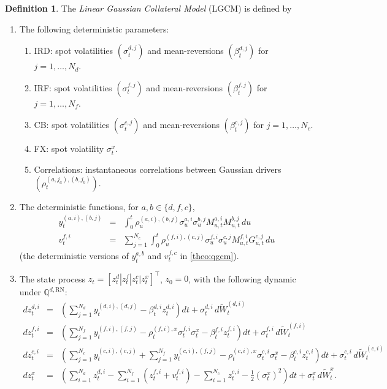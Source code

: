 \documentclass[11pt,english]{amsart}
\newcommand{\RN}{\mathrm{RN}}
\newcommand{\QQ}{\mathbb{Q}}
\theoremstyle{definition}
\newtheorem{defi}{Definition}
\begin{document}
\begin{defi}\label{defi:lgcm}
The \emph{Linear Gaussian Collateral Model} (LGCM) is defined by
\begin{enumerate}
\item The following deterministic parameters:
\begin{enumerate}
\item IRD: spot volatilities $(\sigma^{d,j}_t)$ and mean-reversions $(\beta^{d,j}_t)$ for $j = 1,\ldots, N_d$.
\item IRF: spot volatilities $(\sigma^{f,j}_t)$ and mean-reversions $(\beta^{f,j}_t)$ for $j = 1,\ldots, N_f$.
\item CB: spot volatilities $(\sigma^{c,j}_t)$ and mean-reversions $(\beta^{c,j}_t)$ for $j = 1,\ldots, N_{c}$.
\item FX: spot volatility $\sigma^{x}_t$.
\item Correlations: instantaneous correlations between Gaussian drivers $(\rho^{(a,j_a),(b,j_b)}_t)$.
\end{enumerate}
\item The deterministic functions, for $a,b\in\{d,f,c\}$,
\begin{eqnarray}
  y^{(a,i),(b,j)}_t &=& \int_0^t \rho^{(a,i),(b,j)}_u \sigma^{a,i}_u \sigma^{b,j}_u M^{a,i}_{u,t} M^{b,j}_{u,t}\, du  \\
  v^{f,i}_t &=& \sum_{j=1}^{N_c}\int_0^t \rho^{(f,i),(c,j)}_u \sigma^{f,i}_u \sigma^{c,j}_u M^{f,i}_{u,t} G^{c,j}_{u,t}\, du
\end{eqnarray}
(the deterministic versions of $y^{a,b}_t$ and $v^{f,c}_t$ in \autoref{theo:qgcm}).
\item The state process $z_t = [z^d_t|z^f_t|z^{c}_t|z^{x}_t]^\top$, $z_0 = 0$, with the following dynamic under $\QQ^{d,\RN}$:
\begin{eqnarray}
  dz^{d,i}_{t}  &=& \left( \sum_{j=1}^{N_d} y^{(d,i),(d,j)}_t - \beta^{d,i}_t z^{d,i}_t \right) dt + \sigma^{d,i}_t \, d\widetilde{W}^{(d,i)}_t \\
  dz^{f,i}_{t}  &=& \left( \sum_{j=1}^{N_f} y^{(f,i),(f,j)}_t - \rho^{(f,i),x}_t\sigma^{f,i}_t\sigma^{x}_t - \beta^{f,i}_t z^{f,i}_t \right) dt + \sigma^{f,i}_t \, d\widetilde{W}^{(f,i)}_t \\
  dz^{c,i}_{t}  &=& \left( \sum_{j=1}^{N_c} y^{(c,i),(c,j)}_t + \sum_{j=1}^{N_f} y^{(c,i),(f,j)}_t - \rho^{(c,i),x}_t\sigma^{c,i}_t\sigma^{x}_t - \beta^{c,i}_t z^{c,i}_t \right) dt + \sigma^{c,i}_t \, d\widetilde{W}^{(c,i)}_t \\
  dz^{x}_{t}  &=& \left( \sum_{i=1}^{N_d} z^{d,i}_t - \sum_{i=1}^{N_f} \left(z^{f,i}_t + v^{f,i}_t\right) - \sum_{i=1}^{N_c} z^{c,i}_t - \frac{1}{2}\left(\sigma^x_t\right)^2 \right) dt + \sigma^{x}_t \, d\widetilde{W}^x_t .

\end{eqnarray}
\end{enumerate}
\end{defi}
\end{document}
